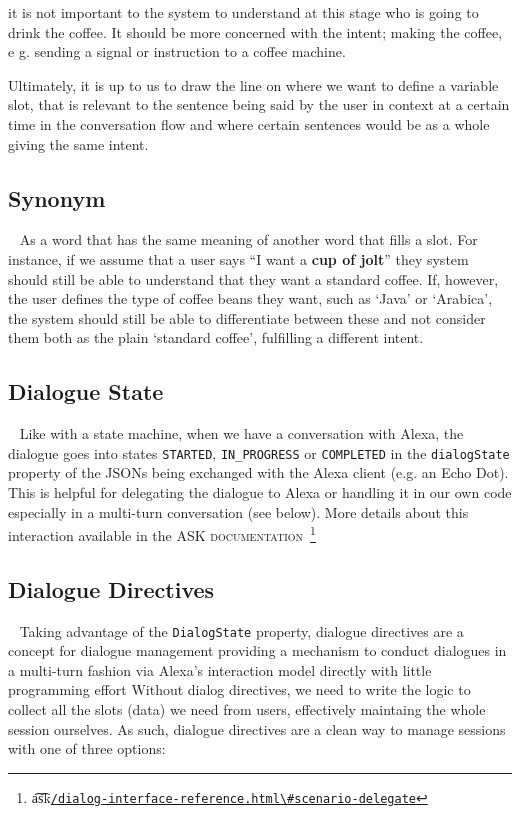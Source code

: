 
	it is not important to the system to understand at this stage who is going to drink the coffee. It should be more concerned with the intent; making the coffee, e g. sending a signal or instruction to a coffee machine.
	 
	Ultimately, it is up to us to draw the line on where we want to define a variable slot, that is relevant to the sentence being said by the user in context at a certain time in the conversation flow and where certain sentences would be as a whole giving the same intent.
	
	
	\subsection*{Synonym}~\label{synonym:def}
	As a word that has the same meaning of another word that fills a slot. For instance, if we assume that a user says ``I want a \textbf{cup of jolt}'' they system should still be able to understand that they want a standard coffee. If, however, the user defines the type of coffee beans they want, such as `Java' or `Arabica', the system should still be able to differentiate between these and not consider them both as the plain `standard coffee', fulfilling a different intent. 
	
	\subsection*{Dialogue State}~\label{dialogState}
	Like with a state machine, when we have a conversation with Alexa, the dialogue goes into states \texttt{STARTED}, \texttt{IN_PROGRESS} or \texttt{COMPLETED} in the \texttt{dialogState} property of the JSONs being exchanged with the Alexa client (e.g. an Echo Dot). This is helpful for delegating the dialogue to Alexa or handling it in our own code especially in a %
		multi-turn conversation
(see below). More details about this interaction available in the \textsc{ASK documentation}~\footnote{\t{a\t{sk}}\href{https://developer.amazon.com/docs/custom-skills/dialog-interface-reference.html\#scenario-delegate}{\lstinline|/dialog-interface-reference.html\#scenario-delegate|}}
	
	

	\subsection*{Dialogue Directives}~\label{directives:def}
	Taking advantage of the \texttt{DialogState} property, dialogue directives are a concept for dialogue management providing a mechanism to conduct dialogues in a multi-turn fashion via Alexa's interaction model directly with little programming effort 
	Without dialog directives, we need to write the logic to collect all the slots (data) we need from users, effectively maintaing the whole session ourselves.
	As such, dialogue directives are a clean way to manage sessions with one of three options: 
	
